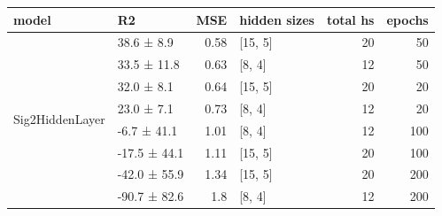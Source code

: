 \begin{longtable}{llrlrr}
\hline
 model   & R2           &   MSE & hidden sizes   &   total hs &   epochs \\
\hline
 \hline
\multirow{8}{*}{Sig2HiddenLayer}         & 38.6 ± 8.9   &  0.58 & [15, 5]        &         20 &       50 \\
         & 33.5 ± 11.8  &  0.63 & [8, 4]         &         12 &       50 \\
         & 32.0 ± 8.1   &  0.64 & [15, 5]        &         20 &       20 \\
         & 23.0 ± 7.1   &  0.73 & [8, 4]         &         12 &       20 \\
         & -6.7 ± 41.1  &  1.01 & [8, 4]         &         12 &      100 \\
         & -17.5 ± 44.1 &  1.11 & [15, 5]        &         20 &      100 \\
         & -42.0 ± 55.9 &  1.34 & [15, 5]        &         20 &      200 \\
         & -90.7 ± 82.6 &  1.8  & [8, 4]         &         12 &      200 \\
\hline
\end{longtable}
